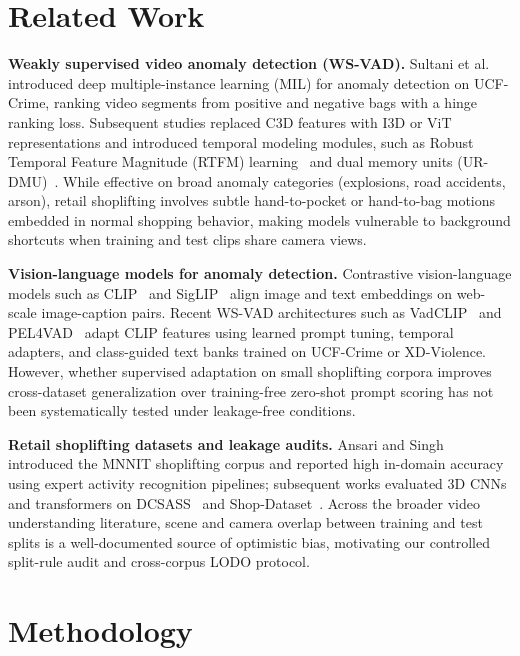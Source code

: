 \documentclass[pdflatex,sn-mathphys-num]{sn-jnl}
\begin{document}
\section{Related Work}\label{sec:related}

\textbf{Weakly supervised video anomaly detection (WS-VAD).} Sultani et al.~\cite{sultani2018} introduced deep multiple-instance learning (MIL) for anomaly detection on UCF-Crime, ranking video segments from positive and negative bags with a hinge ranking loss. Subsequent studies replaced C3D features with I3D or ViT representations and introduced temporal modeling modules, such as Robust Temporal Feature Magnitude (RTFM) learning~\cite{tian2021} and dual memory units (UR-DMU)~\cite{zhou2023urdmu}. While effective on broad anomaly categories (explosions, road accidents, arson), retail shoplifting involves subtle hand-to-pocket or hand-to-bag motions embedded in normal shopping behavior, making models vulnerable to background shortcuts when training and test clips share camera views.

\textbf{Vision-language models for anomaly detection.} Contrastive vision-language models such as CLIP~\cite{radford2021} and SigLIP~\cite{zhai2023} align image and text embeddings on web-scale image-caption pairs. Recent WS-VAD architectures such as VadCLIP~\cite{wu2024} and PEL4VAD~\cite{pu2024pel4vad} adapt CLIP features using learned prompt tuning, temporal adapters, and class-guided text banks trained on UCF-Crime or XD-Violence. However, whether supervised adaptation on small shoplifting corpora improves cross-dataset generalization over training-free zero-shot prompt scoring has not been systematically tested under leakage-free conditions.

\textbf{Retail shoplifting datasets and leakage audits.} Ansari and Singh~\cite{ansari2022esar,mnnitmendeley} introduced the MNNIT shoplifting corpus and reported high in-domain accuracy using expert activity recognition pipelines; subsequent works evaluated 3D CNNs and transformers on DCSASS~\cite{dcsass} and Shop-Dataset~\cite{shopkaggle}. Across the broader video understanding literature, scene and camera overlap between training and test splits is a well-documented source of optimistic bias, motivating our controlled split-rule audit and cross-corpus LODO protocol.

\section{Methodology}\label{sec:method}
\end{document}
